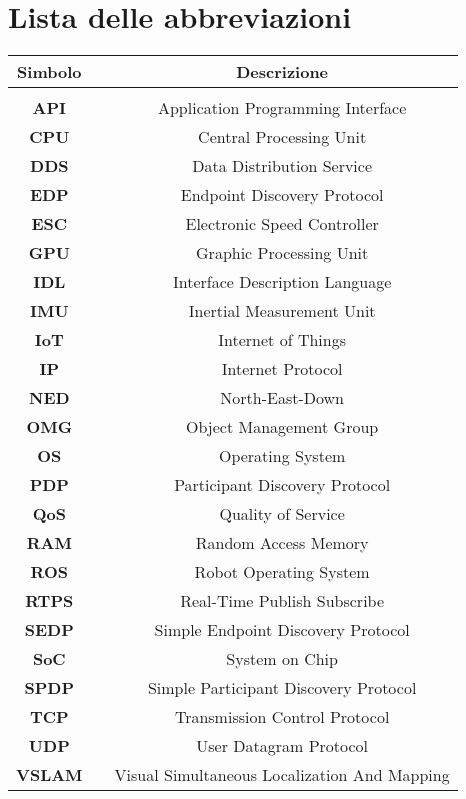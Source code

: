 

\fancyhf{}
\thispagestyle{plain}

\chapter[Lista delle abbreviazioni]{\centering Lista delle abbreviazioni}
\fontsize{14}{14}\selectfont

\begin{center}
\centering
\setlength{\tabcolsep}{15pt}
\fontsize{12}{12}\selectfont
\begin{tabular}{ c c c }
\multicolumn{1}{c}{\Large \textbf{Simbolo}} & & \multicolumn{1}{c}{\Large \textbf{Descrizione}}\\
\hline\hline\\

\textbf{API}   & & Application Programming Interface\\
\textbf{CPU}   & & Central Processing Unit\\
\textbf{DDS}   & & Data Distribution Service\\
\textbf{EDP}   & & Endpoint Discovery Protocol\\
\textbf{ESC}   & & Electronic Speed Controller\\
\textbf{GPU}   & & Graphic Processing Unit\\
\textbf{IDL}   & & Interface Description Language\\
\textbf{IMU}   & & Inertial Measurement Unit\\
\textbf{IoT}   & & Internet of Things\\
\textbf{IP}    & & Internet Protocol\\
\textbf{NED}   & & North-East-Down\\
\textbf{OMG}   & & Object Management Group\\
\textbf{OS}    & & Operating System\\
\textbf{PDP}   & & Participant Discovery Protocol\\
\textbf{QoS}   & & Quality of Service\\
\textbf{RAM}   & & Random Access Memory\\
\textbf{ROS}   & & Robot Operating System\\
\textbf{RTPS}  & & Real-Time Publish Subscribe\\
\textbf{SEDP}  & & Simple Endpoint Discovery Protocol\\
\textbf{SoC}   & & System on Chip\\
\textbf{SPDP}  & & Simple Participant Discovery Protocol\\
\textbf{TCP}   & & Transmission Control Protocol\\
\textbf{UDP}   & & User Datagram Protocol\\
\textbf{VSLAM} & & Visual Simultaneous Localization And Mapping\\

\end{tabular}
\end{center}

\restoregeometry
